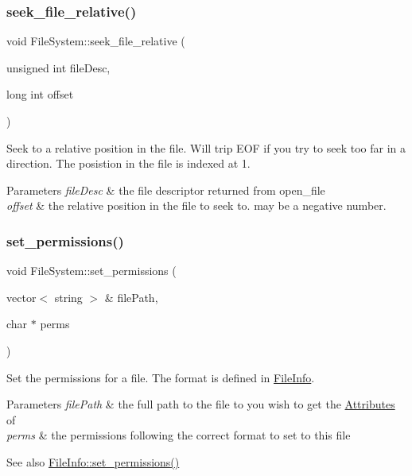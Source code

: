 \subsubsection{\texorpdfstring{seek\+\_\+file\+\_\+relative()}{seek\_file\_relative()}}
{\footnotesize\ttfamily void File\+System\+::seek\+\_\+file\+\_\+relative (\begin{DoxyParamCaption}\item[{unsigned int}]{file\+Desc,  }\item[{long int}]{offset }\end{DoxyParamCaption})}

Seek to a relative position in the file. Will trip E\+OF if you try to seek too far in a direction. The posistion in the file is indexed at 1. 
\begin{DoxyParams}{Parameters}
{\em file\+Desc} & the file descriptor returned from open\+\_\+file \\
\hline
{\em offset} & the relative position in the file to seek to. may be a negative number. \\
\hline
\end{DoxyParams}
\mbox{\label{classFileSystem_abfa7e15fdbeaaaabfa3a542625c90b83}} 
\subsubsection{\texorpdfstring{set\+\_\+permissions()}{set\_permissions()}}
{\footnotesize\ttfamily void File\+System\+::set\+\_\+permissions (\begin{DoxyParamCaption}\item[{vector$<$ string $>$ \&}]{file\+Path,  }\item[{char $\ast$}]{perms }\end{DoxyParamCaption})}

Set the permissions for a file. The format is defined in \mbox{\hyperlink{classFileInfo}{File\+Info}}. 
\begin{DoxyParams}{Parameters}
{\em file\+Path} & the full path to the file to you wish to get the \mbox{\hyperlink{classAttributes}{Attributes}} of \\
\hline
{\em perms} & the permissions following the correct format to set to this file \\
\hline
\end{DoxyParams}
\begin{DoxySeeAlso}{See also}
\mbox{\hyperlink{classFileInfo_a377208012195dba0b24723837f6db39f}{File\+Info\+::set\+\_\+permissions()}} 
\end{DoxySeeAlso}
\mbox{\label{classFileSystem_a33649a9100b30978db80654ece6504f4}} 
